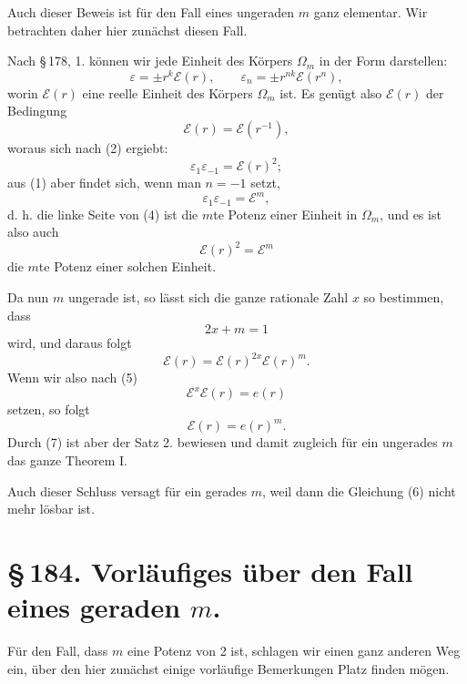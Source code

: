 \documentclass[11pt]{article}
\begin{document}
Auch dieser Beweis ist für den Fall eines ungeraden $m$ ganz elementar. Wir betrachten daher hier zunächst diesen Fall.

Nach \S\,178, 1. können wir jede Einheit des Körpers $\Omega_m$ in der Form darstellen:
\begin{equation}
\varepsilon=\pm r^k\mathscr E(r),\qquad
\varepsilon_n=\pm r^{nk}\mathscr E(r^n),
\tag{2}
\end{equation}
worin $\mathscr E(r)$ eine reelle Einheit des Körpers $\Omega_m$ ist. Es genügt also $\mathscr E(r)$ der Bedingung
\begin{equation}
\mathscr E(r)=\mathscr E(r^{-1}),
\tag{3}
\end{equation}
woraus sich nach (2) ergiebt:
\begin{equation}
\varepsilon_1\varepsilon_{-1}=\mathscr E(r)^2;
\tag{4}
\end{equation}
aus (1) aber findet sich, wenn man $n=-1$ setzt,
\[
\varepsilon_1\varepsilon_{-1}=\mathscr E^m,
\]
d. h. die linke Seite von (4) ist die $m$te Potenz einer Einheit in $\Omega_m$, und es ist also auch
\begin{equation}
\mathscr E(r)^2=\mathscr E^m
\tag{5}
\end{equation}
die $m$te Potenz einer solchen Einheit.

Da nun $m$ ungerade ist, so lässt sich die ganze rationale Zahl $x$ so bestimmen, dass
\begin{equation}
2x+m=1
\tag{6}
\end{equation}
wird, und daraus folgt
\[
\mathscr E(r)=\mathscr E(r)^{2x}\mathscr E(r)^m.
\]
Wenn wir also nach (5)
\[
\mathscr E^x\mathscr E(r)=e(r)
\]
setzen, so folgt
\begin{equation}
\mathscr E(r)=e(r)^m.
\tag{7}
\end{equation}
Durch (7) ist aber der Satz 2. bewiesen und damit zugleich für ein ungerades $m$ das ganze Theorem I.

Auch dieser Schluss versagt für ein gerades $m$, weil dann die Gleichung (6) nicht mehr lösbar ist.

\section*{\S\,184. Vorläufiges über den Fall eines geraden $m$.}

Für den Fall, dass $m$ eine Potenz von 2 ist, schlagen wir einen ganz anderen Weg ein, über den hier zunächst einige vorläufige Bemerkungen Platz finden mögen.
\end{document}
